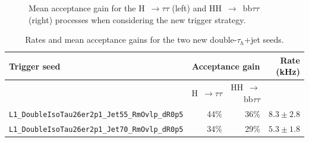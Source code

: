 \documentclass[../main.tex]{subfiles}
\begin{document}
\begin{figure}
\caption{Mean acceptance gain for the H~$\to\tau\tau$ (left) and HH~$\to$~bb$\tau\tau$ (right) processes when considering the new trigger strategy.}
\label{hh:fig:l1_trig_mean_acc}
\end{figure}

\begin{table}[h!]
\begin{small}
\begin{center}
\begin{tabular}{|l|r|r|r|}
\hline
Trigger seed & \multicolumn{2}{c|}{Acceptance gain} &  Rate (kHz) \\
\hline\hline
& H~$\to\tau\tau$ & HH~$\to$~bb$\tau\tau$ &  \\\hline
\texttt{L1\_DoubleIsoTau26er2p1\_Jet55\_RmOvlp\_dR0p5} & 44$\%$ & 36$\%$& $8.3 \pm 2.8$ \\
\texttt{L1\_DoubleIsoTau26er2p1\_Jet70\_RmOvlp\_dR0p5} & 34$\%$ & 29$\%$ & $5.3 \pm 1.8$ \\\hline
\end{tabular}
\end{center}
\end{small}

\caption{Rates and mean acceptance gains for the two new double-$\tau_h$+jet seeds.}
\label{hh:tab:l1trig:allseeds}
\end{table}

\end{document}
